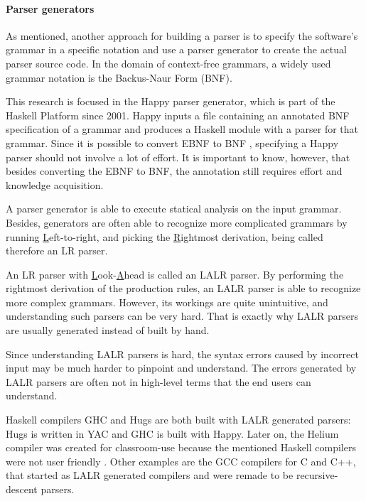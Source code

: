 \paragraph{Parser generators}
As mentioned, another approach for building a parser is to specify the software's grammar in a specific notation and use a parser generator to create the actual parser source code.
In the domain of context-free grammars, a widely used grammar notation is the Backus-Naur Form (BNF).

%
This research is focused in the Happy parser generator, which is part of the Haskell Platform since 2001.
Happy inputs a file containing an annotated BNF specification of a grammar and produces a Haskell module with a parser for that grammar.
Since it is possible to convert EBNF to BNF , specifying a Happy parser should not involve a lot of effort.
It is important to know, however, that besides converting the EBNF to BNF, the annotation still requires effort and knowledge acquisition.

%
A parser generator is able to execute statical analysis on the input grammar.
Besides, generators are often able to recognize more complicated grammars by running \underline{L}eft-to-right, and picking the \underline{R}ightmost derivation, being called therefore an LR parser.

%
An LR parser with \underline{L}ook-\underline{A}head is called an LALR parser.
By performing the rightmost derivation of the production rules, an LALR parser is able to recognize more complex grammars.
However, its workings are quite unintuitive, and understanding such parsers can be very hard.
That is exactly why LALR parsers are usually generated instead of built by hand.

Since understanding LALR parsers is hard, the syntax errors caused by incorrect input may be much harder to pinpoint and understand.
The errors generated by LALR parsers are often not in high-level terms that the end users can understand.

%
%
%
%
%
Haskell compilers GHC and Hugs are both built with LALR generated parsers: Hugs is written in YAC and GHC is built with Happy.
Later on, the Helium compiler was created for classroom-use because the mentioned Haskell compilers were not user friendly .
Other examples are the GCC compilers for C and C++, that started as LALR generated compilers and were remade to be recursive-descent parsers.

